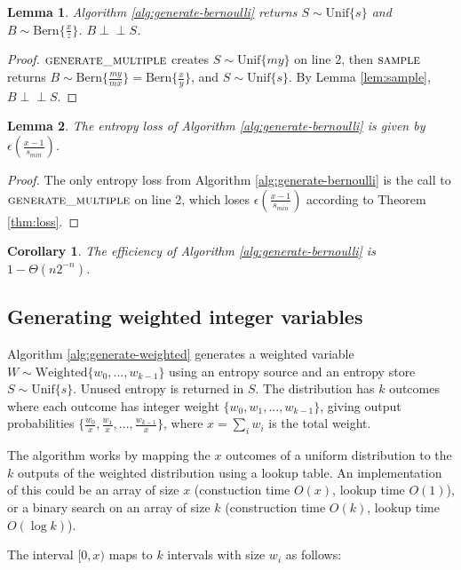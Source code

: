 \documentclass[lettersize,journal]{IEEEtran}
\newtheorem{lemma}{Lemma}
\newtheorem{corollary}{Corollary}
\newcommand{\indep}{\perp\!\!\!\perp}
\newcommand{\unif}[1]{\mathrm{Unif}\{#1\}}
\newcommand{\bern}[1]{\mathrm{Bern}\{#1\}}
\begin{document}
\begin{lemma}
Algorithm \ref{alg:generate-bernoulli} returns $S \sim \unif{s}$ and $B \sim \bern{\frac{x}{z}}$. $B \indep S$.
\end{lemma}

\begin{proof}
    $\textsc{generate\_multiple}$ creates $S \sim \unif{my}$ on line 2, then $\textsc{sample}$ returns $B \sim \bern{\frac{my}{mx}} = \bern{\frac{x}{y}}$, and $S \sim \unif{s}$. By Lemma \ref{lem:sample}, $B \indep S$.
\end{proof}

\begin{lemma}
The entropy loss of Algorithm \ref{alg:generate-bernoulli} is given by $\epsilon(\frac{x-1}{s_{min}})$.
\end{lemma}

\begin{proof}
    The only entropy loss from Algorithm \ref{alg:generate-bernoulli} is the call to $\textsc{generate\_multiple}$ on line 2, which loses $\epsilon(\frac{x-1}{s_{min}})$ according to Theorem \ref{thm:loss}.
\end{proof}

\begin{corollary}
The efficiency of Algorithm \ref{alg:generate-bernoulli} is $1-\Theta(n2^{-n})$.
\end{corollary}

\subsection{Generating weighted integer variables}

Algorithm \ref{alg:generate-weighted} generates a weighted variable $W \sim \mathrm{Weighted}\{w_0, ..., w_{k-1}\}$ using an entropy source and an entropy store $S \sim \unif{s}$. Unused entropy is returned in $S$. The distribution has $k$ outcomes where each outcome has integer weight $\{w_0, w_1, ..., w_{k-1}\}$, giving output probabilities $\{\frac{w_0}{x}, \frac{w_1}{x}, ..., \frac{w_{k-1}}{x}\}$, where $x=\sum_i w_i$ is the total weight.

The algorithm works by mapping the $x$ outcomes of a uniform distribution to the $k$ outputs of the weighted distribution using a lookup table. An implementation of this could be an array of size $x$ (constuction time $O(x)$, lookup time $O(1)$), or a binary search on an array of size $k$ (construction time $O(k)$, lookup time $O(\log k)$).

The interval $[0,x)$ maps to $k$ intervals with size $w_i$ as follows:
\end{document}
